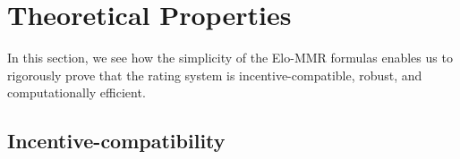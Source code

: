 \section{Theoretical Properties}
\label{sec:properties}
In this section, we see how the simplicity of the Elo-MMR formulas enables us to rigorously prove that the rating system is incentive-compatible, robust, and computationally efficient.

\vspace{-.6em}
\subsection{Incentive-compatibility}
\label{sec:mono}




